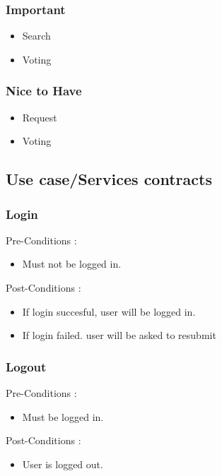 \documentclass[12pt, oneside]{article}
\begin{document}
		\subsubsection{Important}
			\begin{itemize}
				\item Search
				\item Voting
			 \end{itemize}
		\subsubsection{Nice to Have}
			\begin{itemize}
				\item Request
				\item Voting
			 \end{itemize}
	\subsection{Use case/Services contracts}
			\subsubsection{Login}
				Pre-Conditions : \begin{itemize}
							\item Must not be logged in.
						     \end{itemize}
				Post-Conditions : \begin{itemize}
							\item If login succesful, user will be logged in.
							\item If login failed. user will be asked to resubmit
						     \end{itemize}
			\subsubsection{Logout}
				Pre-Conditions : \begin{itemize}
							\item Must be logged in.
						     \end{itemize}
				Post-Conditions : \begin{itemize}
							\item User is logged out.
						     \end{itemize}
\end{document}

